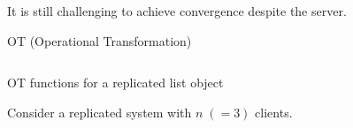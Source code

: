 
\appendix

\begin{frame}{}
  \centerline{}
\end{frame}

\begin{frame}{}
  \centerline{It is still challenging to achieve convergence despite the server.}
  
\end{frame}

\begin{frame}{}
  \centerline{OT (Operational Transformation)~}

  \begin{columns}
      \begin{center}
	
      \end{center}
      \begin{center}
	
      \end{center}
  \end{columns}
\end{frame}

\begin{frame}{}
  \centerline{\large OT functions for a replicated list object~}

  \resizebox{\textwidth}{!}{
    \begin{minipage}{\textwidth}
      
    \end{minipage}
  }
\end{frame}

\begin{frame}{}
  \centerline{\large Consider a replicated system with $n \; (=3)$ clients.}

\end{frame}
